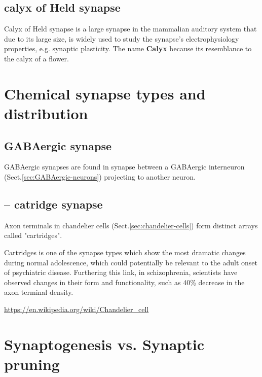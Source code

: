 \subsection{calyx of Held synapse}
\label{sec:synapse-calyx-of-Held}
\label{sec:calyx-of-Held-synapse}

Calyx of Held synapse is a large synapse in the mammalian auditory system that
due to its large size, is widely used to study the synapse's electrophysiology
properties, e.g. synaptic plasticity. The name {\bf Calyx}
because its resemblance to the calyx of a flower.





\section{Chemical synapse types and distribution}
\label{sec:synapse-types}
\label{sec:synapse-distribution}

\subsection{GABAergic synapse}
\label{sec:GABAergic-synapse}

GABAergic synapses are found in synapse between a GABAergic interneuron
(Sect.\ref{sec:GABAergic-neurons}) projecting to another neuron.



\subsection{-- catridge synapse}

Axon terminals in chandelier cells (Sect.\ref{sec:chandelier-cells}) form
distinct arrays called "cartridges".

Cartridges is one of the synapse types which show the most dramatic changes
during normal adolescence, which could potentially be relevant to the adult
onset of psychiatric disease. Furthering this link, in schizophrenia, scientists
have observed changes in their form and functionality, such as 40\% decrease in
the axon terminal density.

\url{https://en.wikipedia.org/wiki/Chandelier_cell}



\section{Synaptogenesis vs. Synaptic pruning}
\label{sec:synaptogenesis}
\label{sec:synapse-formation}

